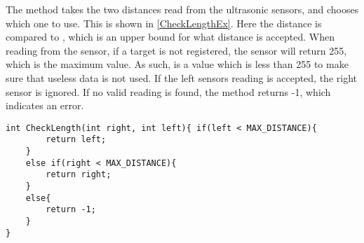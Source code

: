 The  method takes the two distances read from the ultrasonic
sensors, and chooses which one to use. This is shown in \autoref{CheckLengthEx}.
Here the distance is compared to , which is an upper bound
for what distance is accepted. When reading from the sensor, if a target is not
registered, the sensor will return 255, which is the maximum value. As such,
 is a value which is less than 255 to make sure that
useless data is not used. If the left sensors reading is accepted, the right
sensor is ignored. If no valid reading is found, the method returns -1, which
indicates an error.\nl

\begin{minipage}[H]{\linewidth}
\begin{lstlisting}[caption = CheckLength method which chooses the best
\fix{input distance}{Filters out invalid readings?!Could be AVG?}., label =
CheckLengthEx] 
int CheckLength(int right, int left){ if(left < MAX_DISTANCE){
        return left;
    }
    else if(right < MAX_DISTANCE){
        return right;
    }
    else{
        return -1;
    }
}
\end{lstlisting}
\end{minipage}
